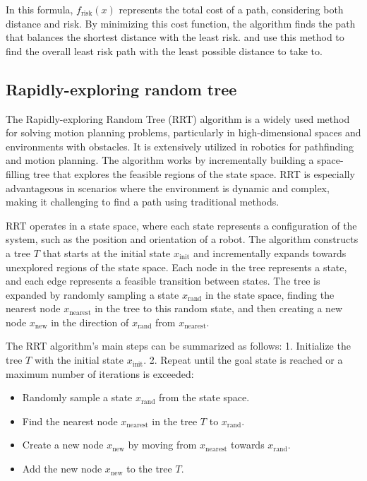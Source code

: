 \documentclass[12pt]{report}
\begin{document}
        In this formula, \( f_{\text{risk}}(x) \) represents the total cost of a path, considering both distance and
        risk. By minimizing this cost function, the algorithm finds the path that balances the shortest distance with
        the least risk. \cite{primatesta_ground_2020} and \cite{la_cour-harbo_quantifying_2019} use this method to find
        the overall least risk path with the least possible distance to take to.
        
        \subsection{Rapidly-exploring random tree}
        The Rapidly-exploring Random Tree (RRT) algorithm is a widely used method for solving motion planning problems,
        particularly in high-dimensional spaces and environments with obstacles. It is extensively utilized in robotics
        for pathfinding and motion planning. The algorithm works by incrementally building a space-filling tree that
        explores the feasible regions of the state space. RRT is especially advantageous in scenarios where the
        environment is dynamic and complex, making it challenging to find a path using traditional methods.
            
        RRT operates in a state space, where each state represents a configuration of the system, such as the position
        and orientation of a robot. The algorithm constructs a tree \( T \) that starts at the initial state \(
        x_{\text{init}} \) and incrementally expands towards unexplored regions of the state space. Each node in the
        tree represents a state, and each edge represents a feasible transition between states. The tree is expanded by
        randomly sampling a state \( x_{\text{rand}} \) in the state space, finding the nearest node
        \(x_{\text{nearest}} \) 
        in the tree to this random state, and then creating a new node \( x_{\text{new}} \) in the
        direction of \( x_{\text{rand}} \) from \( x_{\text{nearest}} \).
            
        The RRT algorithm's main steps can be summarized as follows: 1. Initialize the tree \( T \) with the initial
        state \( x_{\text{init}} \). 2. Repeat until the goal state is reached or a maximum number of iterations is
        exceeded:
           \begin{itemize}
             \item Randomly sample a state \( x_{\text{rand}} \) from the state space.
             \item Find the nearest node \( x_{\text{nearest}} \) in the tree \( T \) to \( x_{\text{rand}} \).
             \item Create a new node \( x_{\text{new}} \) by moving from \( x_{\text{nearest}} \) towards \(
             x_{\text{rand}} \).
             \item Add the new node \( x_{\text{new}} \) to the tree \( T \).
           \end{itemize}
       
\end{document}

